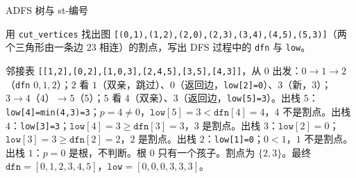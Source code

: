 \begin{exercises}{A}{DFS 树与 st-编号}
\item\label{ex:st-numbering:A3} 用 \texttt{cut\_vertices} 找出图 \texttt{[(0,1),(1,2),(2,0),(2,3),(3,4),(4,5),(5,3)]}（两个三角形由一条边 $23$ 相连）的割点，写出 DFS 过程中的 \texttt{dfn} 与 \texttt{low}。
\begin{solution}
邻接表 \texttt{[[1,2],[0,2],[1,0,3],[2,4,5],[3,5],[4,3]]}，从 $0$ 出发：$0\to1\to2$（\texttt{dfn} $0,1,2$）；$2$ 看 $1$（双亲，跳过）、$0$（返回边，\texttt{low[2]=0}）、$3$（新，$3$）；$3\to4$（$4$）$\to5$（$5$）；$5$ 看 $4$（双亲）、$3$（返回边，\texttt{low[5]=3}）。出栈 $5$：\texttt{low[4]=min(4,3)=3}；$p=4\neq0$，$\texttt{low}[5]=3<\texttt{dfn}[4]=4$，$4$ 不是割点。出栈 $4$：\texttt{low[3]=3}；$\texttt{low}[4]=3\geqslant\texttt{dfn}[3]=3$，$3$ 是割点。出栈 $3$：$\texttt{low}[2]=0$；$\texttt{low}[3]=3\geqslant\texttt{dfn}[2]=2$，$2$ 是割点。出栈 $2$：\texttt{low[1]=0}；$0<1$，$1$ 不是割点。出栈 $1$：$p=0$ 是根，不判断。根 $0$ 只有一个孩子。割点为 $\{2,3\}$。最终 $\texttt{dfn}=[0,1,2,3,4,5]$，$\texttt{low}=[0,0,0,3,3,3]$。
\end{solution}
\end{exercises}
